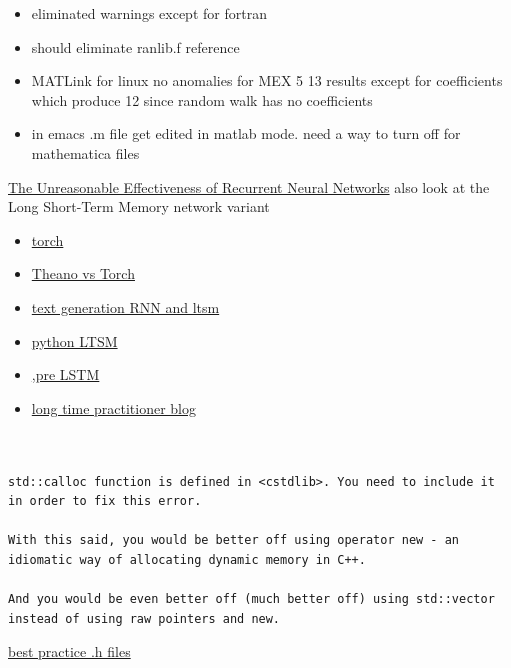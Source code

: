 \documentclass[hyperref]{labbook}
\begin{document}
  \begin{itemize}
  \item eliminated warnings except for fortran 
  \item should eliminate ranlib.f reference
  \end{itemize}
\begin{itemize}
\item MATLink for linux  no anomalies for MEX 5  13 results except for coefficients which produce 12 since random walk has no coefficients
\item in emacs .m file get edited in matlab mode.  need a way to turn off for mathematica files
\end{itemize}


\href{http://karpathy.github.io/2015/05/21/rnn-effectiveness/}{The Unreasonable Effectiveness of Recurrent Neural Networks}  also look at the Long Short-Term Memory network variant
\begin{itemize}
\item \href{http://torch.ch/}{torch}
\item \href{http://fastml.com/torch-vs-theano/}{Theano vs Torch}
\item \href{https://chunml.github.io/ChunML.github.io/project/Creating-Text-Generator-Using-Recurrent-Neural-Network/}{text generation RNN and ltsm}
\item \href{http://machinelearningmastery.com/text-generation-lstm-recurrent-neural-networks-python-keras/}{python LTSM}
\item \href{https://medium.com/@TalPerry/deep-learning-the-stock-market-df853d139e02}{,pre LSTM}
\item \href{https://ehudreiter.com/2016/12/12/nlg-and-ml/}{long time practitioner blog}
\end{itemize}


\begin{verbatim}


std::calloc function is defined in <cstdlib>. You need to include it in order to fix this error.

With this said, you would be better off using operator new - an idiomatic way of allocating dynamic memory in C++.

And you would be even better off (much better off) using std::vector instead of using raw pointers and new.

\end{verbatim}
\href{http://www.acodersjourney.com/2016/05/top-10-c-header-file-mistakes-and-how-to-fix-them/}{best practice .h files}


\end{document}
